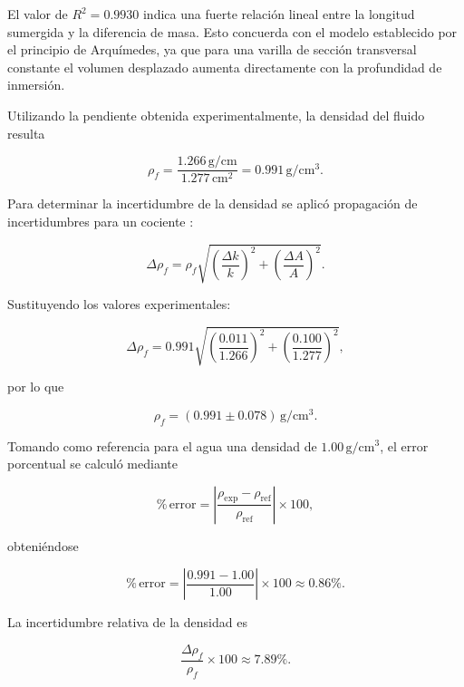 El valor de $R^2=0.9930$ indica una fuerte relación lineal entre la longitud sumergida y la diferencia de masa. 
Esto concuerda con el modelo establecido por el principio de Arquímedes, 
ya que para una varilla de sección transversal constante el volumen desplazado aumenta directamente con la profundidad de inmersión.

Utilizando la pendiente obtenida experimentalmente, la densidad del fluido resulta

\begin{equation}
\rho_f=
\frac{1.266\,\mathrm{g/cm}}
{1.277\,\mathrm{cm^2}}
=
0.991\,\mathrm{g/cm^3}.
\end{equation}

Para determinar la incertidumbre de la densidad se aplicó propagación de incertidumbres para un cociente \cite{taylor1997}:

\begin{equation}
\Delta \rho_f
=
\rho_f
\sqrt{
\left(\frac{\Delta k}{k}\right)^2+
\left(\frac{\Delta A}{A}\right)^2
}.
\end{equation}

Sustituyendo los valores experimentales:

\begin{equation}
\Delta \rho_f
=
0.991
\sqrt{
\left(\frac{0.011}{1.266}\right)^2+
\left(\frac{0.100}{1.277}\right)^2
},
\end{equation}

por lo que

\begin{equation}
\boxed{
\rho_f=(0.991\pm0.078)\,\mathrm{g/cm^3}
}.
\end{equation}

Tomando como referencia para el agua una densidad de
$1.00\,\mathrm{g/cm^3}$, el error porcentual se calculó mediante

\begin{equation}
\%\,\mathrm{error}
=
\left|
\frac{\rho_{\mathrm{exp}}-\rho_{\mathrm{ref}}}
{\rho_{\mathrm{ref}}}
\right|\times 100,
\end{equation}

obteniéndose

\begin{equation}
\%\,\mathrm{error}
=
\left|
\frac{0.991-1.00}{1.00}
\right|\times 100
\approx 0.86\%.
\end{equation}

La incertidumbre relativa de la densidad es

\begin{equation}
\frac{\Delta\rho_f}{\rho_f}\times 100
\approx7.89\%.
\end{equation}

